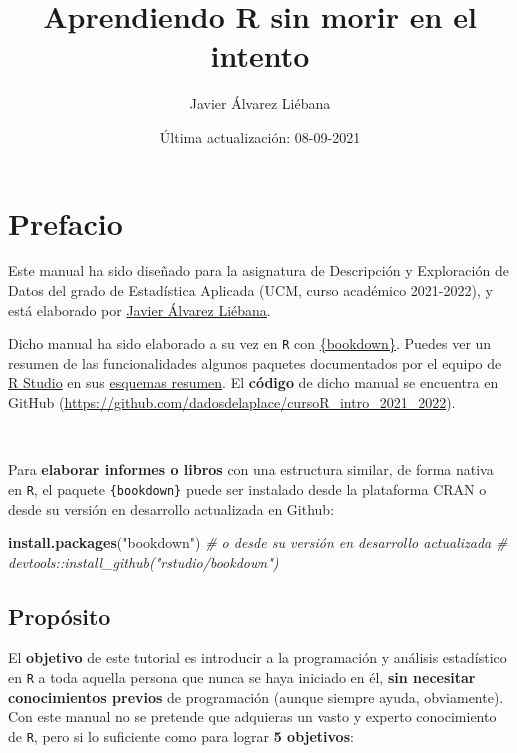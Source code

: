 \documentclass[11pt,]{book}
\title{Aprendiendo R sin morir en el intento}
\author{Javier Álvarez Liébana}
\date{Última actualización: 08-09-2021}
\newenvironment{Shaded}{\begin{snugshade}}{\end{snugshade}}
\newcommand{\CommentTok}[1]{\textcolor[rgb]{0.37,0.37,0.37}{\textit{#1}}}
\newcommand{\KeywordTok}[1]{\textcolor[rgb]{0.27,0.27,0.27}{\textbf{#1}}}
\newcommand{\NormalTok}[1]{#1}
\newcommand{\StringTok}[1]{\textcolor[rgb]{0.5,0.5,0.5}{#1}}
\begin{document}
\maketitle

{
\hypersetup{linkcolor=}
\setcounter{tocdepth}{2}
\tableofcontents
}
\listoftables
\listoffigures
\hypertarget{prefacio}{%
\chapter*{Prefacio}\label{prefacio}}


Este manual ha sido diseñado para la asignatura de Descripción y Exploración de Datos del grado de Estadística Aplicada (UCM, curso académico 2021-2022), y está elaborado por \href{twitter.com/dadosdelaplace}{Javier Álvarez Liébana}.

Dicho manual ha sido elaborado a su vez en \texttt{R} con \href{https://github.com/rstudio/bookdown}{\{bookdown\}}. Puedes ver un resumen de las funcionalidades algunos paquetes documentados por el equipo de \href{https://www.rstudio.com/}{R Studio} en sus \href{https://www.rstudio.com/resources/cheatsheets/}{esquemas resumen}. El \textbf{código} de dicho manual se encuentra en GitHub (\url{https://github.com/dadosdelaplace/cursoR_intro_2021_2022}).

~

Para \textbf{elaborar informes o libros} con una estructura similar, de forma nativa en \texttt{R}, el paquete \texttt{\{bookdown\}} puede ser instalado desde la plataforma CRAN o desde su versión en desarrollo actualizada en Github:

\begin{Shaded}
\begin{Highlighting}[]
\KeywordTok{install.packages}\NormalTok{(}\StringTok{"bookdown"}\NormalTok{)}
\CommentTok{# o desde su versión en desarrollo actualizada}
\CommentTok{# devtools::install_github("rstudio/bookdown")}
\end{Highlighting}
\end{Shaded}

\hypertarget{propuxf3sito}{%
\section*{Propósito}\label{propuxf3sito}}


El \textbf{objetivo} de este tutorial es introducir a la programación y análisis estadístico en \texttt{R} a toda aquella persona que nunca se haya iniciado en él, \textbf{sin necesitar conocimientos previos} de programación (aunque siempre ayuda, obviamente). Con este manual no se pretende que adquieras un vasto y experto conocimiento de \texttt{R}, pero si lo suficiente como para lograr \textbf{5 objetivos}:
\end{document}
